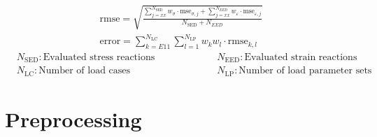 \begin{center}
    \begin{gather}
        \label{eq: rmse}
            \text{rmse} = \sqrt{\frac{\displaystyle\sum_{j=xx}^{N_\text{SED}} w_{\sigma} \cdot \text{mse}_{\sigma,j} + \displaystyle\sum_{j=xx}^{N_{EED}} w_{\varepsilon} \cdot \text{mse}_{\varepsilon,j}}{N_\text{SED} + N_{\scriptscriptstyle EED}}} \\
            \label{eq: error}
        \text{error} = \sum_{k=E11}^{N_\text{LC}} \sum_{l=1}^{N_\text{LP}} w_k w_l \cdot \text{rmse}_{k,l}  
    \end{gather}
    \begin{equation*}
        \begin{split}
            &N_\text{SED}: \text{Evaluated stress reactions}\\
            &N_{\text{LC}}: \text{Number of load cases}
        \end{split}
        \hspace{2cm}
        \begin{split}
            &N_\text{EED}: \text{Evaluated strain reactions}\\
            &N_{\text{LP}}: \text{Number of load parameter sets}
        \end{split}
    \end{equation*}
\end{center}



\section{Preprocessing} \label{sec: preprocessing}


